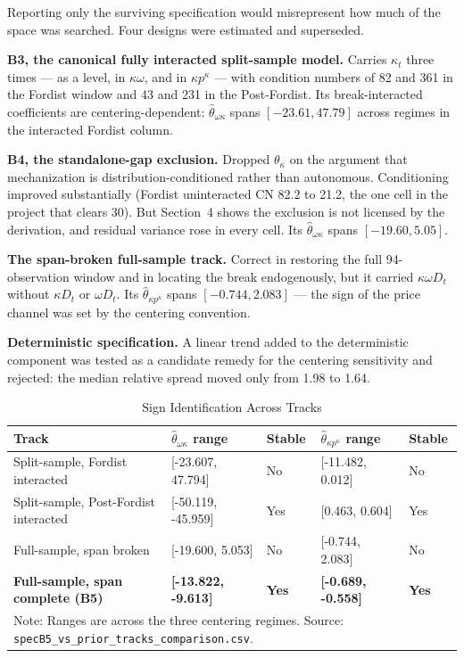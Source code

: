 \documentclass[11pt,a4paper]{article}
\begin{document}
Reporting only the surviving specification would misrepresent how much of the space was searched. Four designs were estimated and superseded.

\textbf{B3, the canonical fully interacted split-sample model.} Carries $\kappa_t$ three times --- as a level, in $\kappa\omega$, and in $\kappa p^{\kappa}$ --- with condition numbers of 82 and 361 in the Fordist window and 43 and 231 in the Post-Fordist. Its break-interacted coefficients are centering-dependent: $\hat{\theta}_{\omega\kappa}$ spans $[-23.61, 47.79]$ across regimes in the interacted Fordist column.

\textbf{B4, the standalone-gap exclusion.} Dropped $\theta_{\kappa}$ on the argument that mechanization is distribution-conditioned rather than autonomous. Conditioning improved substantially (Fordist uninteracted CN 82.2 to 21.2, the one cell in the project that clears 30). But Section~4 shows the exclusion is not licensed by the derivation, and residual variance rose in every cell. Its $\hat{\theta}_{\omega\kappa}$ spans $[-19.60, 5.05]$.

\textbf{The span-broken full-sample track.} Correct in restoring the full 94-observation window and in locating the break endogenously, but it carried $\kappa\omega D_t$ without $\kappa D_t$ or $\omega D_t$. Its $\hat{\theta}_{\kappa p^{\kappa}}$ spans $[-0.744, 2.083]$ --- the sign of the price channel was set by the centering convention.

\textbf{Deterministic specification.} A linear trend added to the deterministic component was tested as a candidate remedy for the centering sensitivity and rejected: the median relative spread moved only from 1.98 to 1.64.

\begin{table}[H]
\centering
\caption{Sign Identification Across Tracks}
\label{tab:tracks}
\small
\begin{tabular}{p{5.6cm}p{3.2cm}p{1.6cm}p{3.0cm}p{1.6cm}}
\toprule
Track & $\hat{\theta}_{\omega\kappa}$ range & Stable & $\hat{\theta}_{\kappa p^{\kappa}}$ range & Stable \\
\midrule
Split-sample, Fordist interacted & [-23.607, 47.794] & No & [-11.482, 0.012] & No \\
Split-sample, Post-Fordist interacted & [-50.119, -45.959] & Yes & [0.463, 0.604] & Yes \\
Full-sample, span broken & [-19.600, 5.053] & No & [-0.744, 2.083] & No \\
\textbf{Full-sample, span complete (B5)} & \textbf{[-13.822, -9.613]} & \textbf{Yes} & \textbf{[-0.689, -0.558]} & \textbf{Yes} \\
\bottomrule
\multicolumn{5}{p{15.5cm}}{\footnotesize Note: Ranges are across the three centering regimes. Source: \texttt{specB5\_vs\_prior\_tracks\_comparison.csv}.}
\end{tabular}
\end{table}
\end{document}
